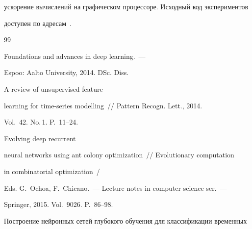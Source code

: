 ускорение вычислений на графическом процессоре. Исходный код экспериментов 


доступен по адресам~\cite{svn,source_popova}.





{\small\frenchspacing


{%




\begin{thebibliography}{99}










 Foundations and advances in deep learning.~--- 


Espoo: Aalto University, 2014.  DSc. Diss.









 A review of unsupervised feature 


learning for time-series modelling~/\!\!/ Pattern Recogn. Lett., 2014. 


Vol.~42. No.\,1. P.~11--24.









 Evolving deep recurrent 


neural networks using ant colony optimization~/\!\!/ Evolutionary computation 


in combinatorial optimization~/


Eds. G.~Ochoa, F.~Chicano.~--- Lecture notes in computer science ser.~---


Springer, 2015. Vol.~9026. P.~86--98.









Построение нейронных сетей глубокого обучения для классификации временных 



\end{thebibliography}}}
